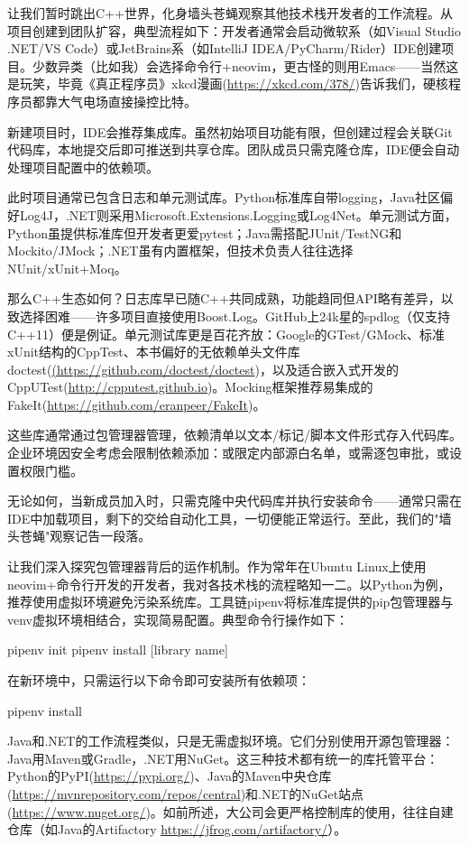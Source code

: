 
让我们暂时跳出C++世界，化身墙头苍蝇观察其他技术栈开发者的工作流程。从项目创建到团队扩容，典型流程如下：开发者通常会启动微软系（如Visual Studio .NET/VS Code）或JetBrains系（如IntelliJ IDEA/PyCharm/Rider）IDE创建项目。少数异类（比如我）会选择命令行+neovim，更古怪的则用Emacs——当然这是玩笑，毕竟《真正程序员》xkcd漫画(\url{https://xkcd.com/378/})告诉我们，硬核程序员都靠大气电场直接操控比特。

新建项目时，IDE会推荐集成库。虽然初始项目功能有限，但创建过程会关联Git代码库，本地提交后即可推送到共享仓库。团队成员只需克隆仓库，IDE便会自动处理项目配置中的依赖项。

此时项目通常已包含日志和单元测试库。Python标准库自带logging，Java社区偏好Log4J，.NET则采用Microsoft.Extensions.Logging或Log4Net。单元测试方面，Python虽提供标准库但开发者更爱pytest；Java需搭配JUnit/TestNG和Mockito/JMock；.NET虽有内置框架，但技术负责人往往选择NUnit/xUnit+Moq。

那么C++生态如何？日志库早已随C++共同成熟，功能趋同但API略有差异，以致选择困难——许多项目直接使用Boost.Log。GitHub上24k星的spdlog（仅支持C++11）便是例证。单元测试库更是百花齐放：Google的GTest/GMock、标准xUnit结构的CppTest、本书偏好的无依赖单头文件库doctest(\url{(https://github.com/doctest/doctest})，以及适合嵌入式开发的CppUTest(\url{http://cpputest.github.io})。Mocking框架推荐易集成的FakeIt(\url{https://github.com/eranpeer/FakeIt})。

这些库通常通过包管理器管理，依赖清单以文本/标记/脚本文件形式存入代码库。企业环境因安全考虑会限制依赖添加：或限定内部源白名单，或需逐包审批，或设置权限门槛。

无论如何，当新成员加入时，只需克隆中央代码库并执行安装命令——通常只需在IDE中加载项目，剩下的交给自动化工具，一切便能正常运行。至此，我们的"墙头苍蝇"观察记告一段落。

让我们深入探究包管理器背后的运作机制。作为常年在Ubuntu Linux上使用neovim+命令行开发的开发者，我对各技术栈的流程略知一二。以Python为例，推荐使用虚拟环境避免污染系统库。工具链pipenv将标准库提供的pip包管理器与venv虚拟环境相结合，实现简易配置。典型命令行操作如下：

\begin{shell}
pipenv init
pipenv install [library name]
\end{shell}

在新环境中，只需运行以下命令即可安装所有依赖项：

\begin{shell}
pipenv install
\end{shell}

Java和.NET的工作流程类似，只是无需虚拟环境。它们分别使用开源包管理器：Java用Maven或Gradle，.NET用NuGet。这三种技术都有统一的库托管平台：Python的PyPI(\url{https://pypi.org/})、Java的Maven中央仓库(\url{https://mvnrepository.com/repos/central})和.NET的NuGet站点(\url{https://www.nuget.org/})。如前所述，大公司会更严格控制库的使用，往往自建仓库（如Java的Artifactory \url{https://jfrog.com/artifactory/}）。

